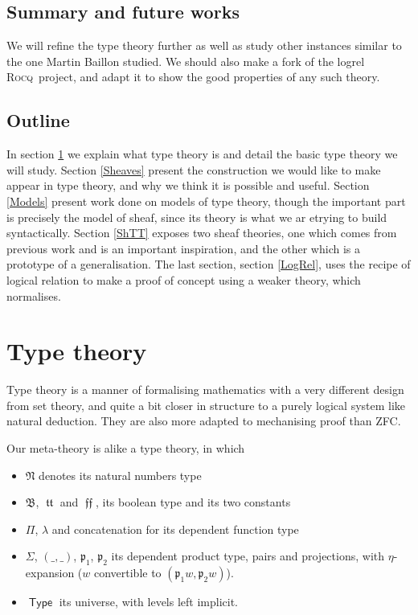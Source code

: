 \documentclass[11pt]{article}
\DeclareMathOperator{\Type}{\mathsf{Type}}
\DeclareMathOperator{\mtrue}{\mathfrak{tt}}
\DeclareMathOperator{\mfalse}{\mathfrak{ff}}
\newcommand{\0}{\mathbf{0}}
\newcommand{\1}{\mathbf{1}}
\newcommand{\mnat}{\mathfrak{N}}
\newcommand{\mbool}{\mathfrak{B}}
\newcommand{\rocq}{\textsc{Rocq}}
\begin{document}
\subsection*{Summary and future works}
We will refine the type theory further as well as study other instances similar to the one Martin Baillon studied.
We should also make a fork of the logrel \rocq\ project, and adapt it to show the good properties of any such theory.
\newpage
\tableofcontents
\newpage

\subsection*{Outline}

In section \ref{TT} we explain what type theory is and detail the basic type theory we will study. Section \ref{Sheaves} present the construction we would like to make appear in type theory, and why we think it is possible and useful. Section \ref{Models} present work done on models of type theory, though the important part is precisely the model of sheaf, since its theory is what we ar etrying to build syntactically. Section \ref{ShTT} exposes two sheaf theories, one which comes from previous work and is an important inspiration, and the other which is a prototype of a generalisation. The last section, section \ref{LogRel}, uses the recipe of logical relation to make a proof of concept using a weaker theory, which normalises.

\section{Type theory}\label{TT}

Type theory is a manner of formalising mathematics with a very different design from set theory, and quite a bit closer in structure to a purely logical system like natural deduction. They are also more adapted to mechanising proof than ZFC.

Our meta-theory is alike a type theory, in which 
\begin{itemize}
    \item $\mnat$ denotes its natural numbers type
    \item $\mbool$, $\mtrue$ and $\mfalse$, its boolean type and its two constants
    \item $\Pi$, $\lambda$ and concatenation for its dependent function type
    \item $\Sigma$, $(\_,\_)$, $\mathfrak{p}_1$, $\mathfrak{p}_2$ its dependent product type, pairs and projections, with $\eta$-expansion ($w$ convertible to $(\mathfrak{p}_1 w, \mathfrak{p}_2 w)$).
    \item $\Type$ its universe, with levels left implicit.
\end{itemize}
\end{document}
